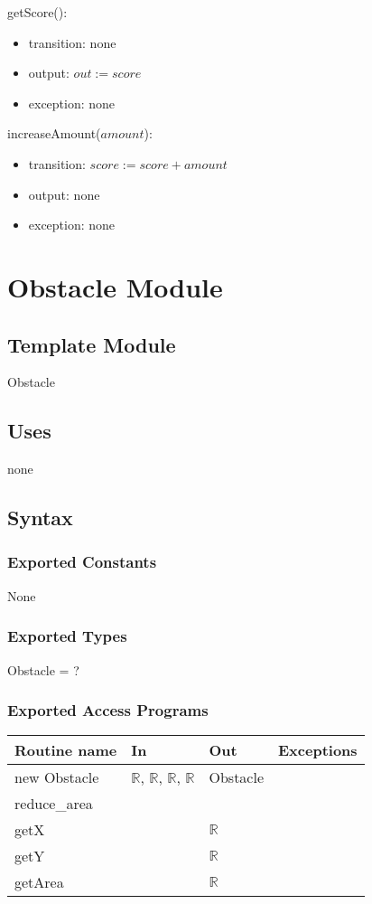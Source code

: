 \documentclass[12pt]{article}
\begin{document}
\noindent getScore():
\begin{itemize}
\item transition: none
\item output: $out := score$
\item exception: none
\end{itemize}

\noindent increaseAmount($\mathit{amount}$):
\begin{itemize}
\item transition: $score := score + amount$ 
\item output: none
\item exception: none
\end{itemize}
\newpage

\section{Obstacle Module}

\subsection*{Template Module}
Obstacle

\subsection*{Uses}
none

\subsection*{Syntax}
\subsubsection*{Exported Constants}
None
\subsubsection*{Exported Types}
Obstacle = ?
\subsubsection*{Exported Access Programs}
\begin{tabular}{| l | l | l | p{5cm} |}
\hline
\textbf{Routine name} & \textbf{In} & \textbf{Out} & \textbf{Exceptions}\\
\hline
new Obstacle & $\mathbb{R}$, $\mathbb{R}$, $\mathbb{R}$, $\mathbb{R}$ & Obstacle &\\
\hline
reduce\_area &&&\\
\hline
getX &    & $\mathbb{R}$ & \\
\hline
getY &    & $\mathbb{R}$ & \\
\hline
getArea &    & $\mathbb{R}$ & \\
\hline
\end{tabular}
\end{document}
